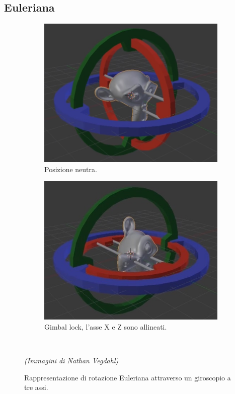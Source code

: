 \subsection{Euleriana}

\begin{figure}
\centering
\begin{subfigure}{.5\textwidth}
  \centering
  \includegraphics[width=.9\linewidth]{Figures/euler-1.jpg}
  \caption{Posizione neutra.}
  \label{fig:eulerA}
\end{subfigure}%
\begin{subfigure}{.5\textwidth}
  \centering
  \includegraphics[width=.9\linewidth]{Figures/euler-2.jpg}
  \caption{Gimbal lock, l'asse X e Z sono allineati.}
  \label{fig:eulerB}
\end{subfigure}\\[2ex]
  \begin{minipage}{\textwidth}
  \footnotesize
  \emph{(Immagini di Nathan Vegdahl)}
  \end{minipage}
\decoRule
\caption[Rotazione Euleriana]{Rappresentazione di rotazione Euleriana attraverso un giroscopio a tre assi.}
\label{fig:euler}
\end{figure}


